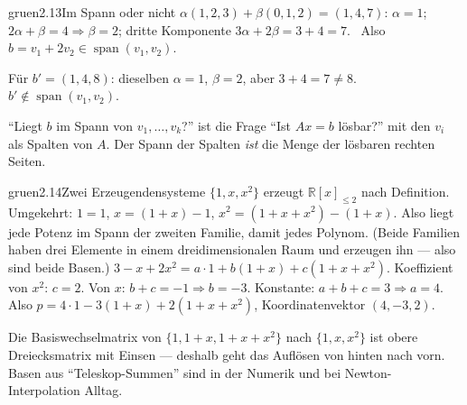 \begin{loesungkarte}{gruen}{2.13}{Im Spann oder nicht}
$\alpha(1, 2, 3) + \beta(0, 1, 2) = (1, 4, 7)$: $\alpha = 1$; $2\alpha + \beta = 4\Rightarrow\beta = 2$; dritte Komponente $3\alpha + 2\beta = 3 + 4 = 7$. \checkmark\ Also $b = v_1 + 2v_2\in\operatorname{span}(v_1, v_2)$.

Für $b' = (1, 4, 8)$: dieselben $\alpha = 1$, $\beta = 2$, aber $3 + 4 = 7\neq8$. $b'\notin\operatorname{span}(v_1, v_2)$.
\begin{mitnehmen}\kastentext
\enquote{Liegt $b$ im Spann von $v_1, \dots, v_k$?} ist die Frage \enquote{Ist $Ax = b$ lösbar?} mit den $v_i$ als Spalten von $A$. Der Spann der Spalten \emph{ist} die Menge der lösbaren rechten Seiten.
\end{mitnehmen}
\end{loesungkarte}

\begin{loesungkarte}{gruen}{2.14}{Zwei Erzeugendensysteme}
$\{1, x, x^{2}\}$ erzeugt $\mathbb R[x]_{\le2}$ nach Definition. Umgekehrt: $1 = 1$, $x = (1 + x) - 1$, $x^{2} = (1 + x + x^{2}) - (1 + x)$. Also liegt jede Potenz im Spann der zweiten Familie, damit jedes Polynom. (Beide Familien haben drei Elemente in einem dreidimensionalen Raum und erzeugen ihn --- also sind beide Basen.)
$3 - x + 2x^{2} = a\cdot1 + b(1 + x) + c(1 + x + x^{2})$. Koeffizient von $x^{2}$: $c = 2$. Von $x$: $b + c = -1\Rightarrow b = -3$. Konstante: $a + b + c = 3\Rightarrow a = 4$. Also $p = 4\cdot1 - 3(1 + x) + 2(1 + x + x^{2})$, Koordinatenvektor $(4, -3, 2)$.
\begin{mitnehmen}\kastentext
Die Basiswechselmatrix von $\{1, 1 + x, 1 + x + x^{2}\}$ nach $\{1, x, x^{2}\}$ ist obere Dreiecksmatrix mit Einsen --- deshalb geht das Auflösen von hinten nach vorn. Basen aus \enquote{Teleskop-Summen} sind in der Numerik und bei Newton-Interpolation Alltag.
\end{mitnehmen}
\end{loesungkarte}

